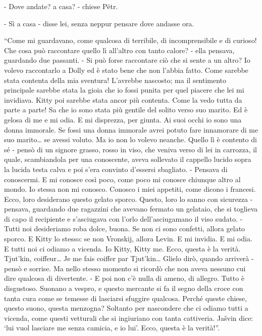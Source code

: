 - Dove andate? a casa? - chiese Pëtr. 

- Sì a casa - disse lei, senza neppur pensare dove andasse ora. 

``Come mi guardavano, come qualcosa di terribile, di incomprensibile e di curioso! Che cosa può raccontare quello lì all'altro con tanto calore? - ella pensava, guardando due passanti. - Si può forse raccontare ciò che si sente a un altro? Io volevo raccontarlo a Dolly ed è stato bene che non l'abbia fatto. Come sarebbe stata contenta della mia sventura! L'avrebbe nascosto; ma il sentimento principale sarebbe stata la gioia che io fossi punita per quel piacere che lei mi invidiava. Kitty poi sarebbe stata ancor più contenta. Come la vedo tutta da parte a parte! Sa che io sono stata più gentile del solito verso suo marito. Ed è gelosa di me e mi odia. E mi disprezza, per giunta. Ai suoi occhi io sono una donna immorale. Se fossi una donna immorale avrei potuto fare innamorare di me suo marito\ldots{} se avessi voluto. Ma io non lo volevo neanche. Quello lì è contento di sé - pensò di un signore grasso, rosso in viso, che veniva verso di lei in carrozza, il quale, scambiandola per una conoscente, aveva sollevato il cappello lucido sopra la lucida testa calva e poi s'era convinto d'essersi sbagliato. - Pensava di conoscermi. E mi conosce così poco, come poco mi conosce chiunque altro al mondo. Io stessa non mi conosco. Conosco i miei appetiti, come dicono i francesi. Ecco, loro desiderano questo gelato sporco. Questo, loro lo sanno con sicurezza - pensava, guardando due ragazzini che avevano fermato un gelataio, che si toglieva di capo il recipiente e s'asciugava con l'orlo dell'asciugamano il viso sudato. - Tutti noi desideriamo roba dolce, buona. Se non ci sono confetti, allora gelato sporco. E Kitty lo stesso: se non Vronskij, allora Levin. E mi invidia. E mi odia. E tutti noi ci odiamo a vicenda. Io Kitty, Kitty me. Ecco, questa è la verità. Tjut'kin, coiffeur\ldots{} Je me fais coiffer par Tjut'kin\ldots{} Glielo dirò, quando arriverà - pensò e sorrise. Ma nello stesso momento si ricordò che non aveva nessuno cui dire qualcosa di divertente. - E poi non c'è nulla di ameno, di allegro. Tutto è disgustoso. Suonano a vespro, e questo mercante si fa il segno della croce con tanta cura come se temesse di lasciarsi sfuggire qualcosa. Perché queste chiese, questo suono, questa menzogna? Soltanto per nascondere che ci odiamo tutti a vicenda, come questi vetturali che si ingiuriano con tanta cattiveria. Jašvin dice: `lui vuol lasciare me senza camicia, e io lui'. Ecco, questa è la verità!''. 

